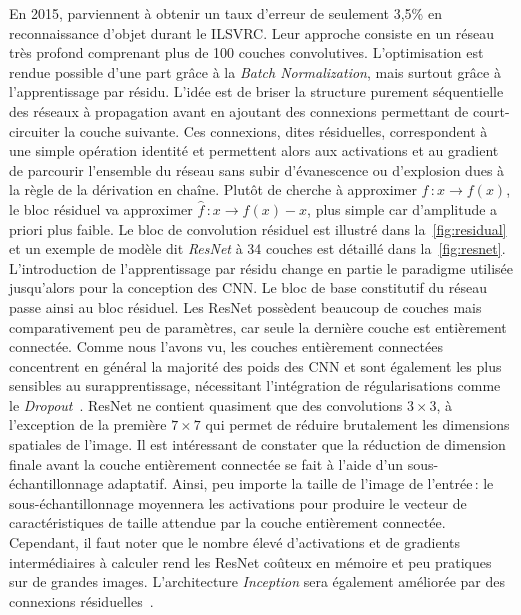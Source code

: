En 2015, \citet{he_deep_2016} parviennent à obtenir un taux d'erreur de seulement 3,5\% en reconnaissance d'objet durant le \gls{ILSVRC}. Leur approche consiste en un réseau très profond comprenant plus de 100 couches convolutives. L'optimisation est rendue possible d'une part grâce à la \emph{Batch Normalization}, mais surtout grâce à l'apprentissage par résidu. L'idée est de briser la structure purement séquentielle des réseaux à propagation avant en ajoutant des connexions permettant de court-circuiter la couche suivante. Ces connexions, dites résiduelles, correspondent à une simple opération identité et permettent alors aux activations et au gradient de parcourir l'ensemble du réseau sans subir d’évanescence ou d'explosion dues à la règle de la dérivation en chaîne. Plutôt de cherche à approximer $f\,: x \rightarrow f(x)$, le bloc résiduel va approximer $\hat{f}\,: x \rightarrow f(x) - x$, plus simple car d'amplitude a priori plus faible. Le bloc de convolution résiduel est illustré dans la~\cref{fig:residual} et un exemple de modèle dit \emph{ResNet} à 34 couches est détaillé dans la~\cref{fig:resnet}. L'introduction de l'apprentissage par résidu change en partie le paradigme utilisée jusqu'alors pour la conception des \gls{CNN}. Le bloc de base constitutif du réseau passe ainsi au bloc résiduel.
Les ResNet possèdent beaucoup de couches mais comparativement peu de paramètres, car seule la dernière couche est entièrement connectée. Comme nous l'avons vu, les couches entièrement connectées concentrent en général la majorité des poids des \gls{CNN} et sont également les plus sensibles au surapprentissage, nécessitant l'intégration de régularisations comme le \emph{Dropout}~\cite{srivastava_dropout_2014}. ResNet ne contient quasiment que des convolutions $3\times3$, à l'exception de la première $7\times7$ qui permet de réduire brutalement les dimensions spatiales de l'image. Il est intéressant de constater que la réduction de dimension finale avant la couche entièrement connectée se fait à l'aide d'un sous-échantillonnage adaptatif. Ainsi, peu importe la taille de l'image de l'entrée\,: le sous-échantillonnage moyennera les activations pour produire le vecteur de caractéristiques de taille attendue par la couche entièrement connectée. Cependant, il faut noter que le nombre élevé d'activations et de gradients intermédiaires à calculer rend les ResNet coûteux en mémoire et peu pratiques sur de grandes images. L'architecture \emph{Inception} sera également améliorée par des connexions résiduelles~\cite{szegedy_inception-v4_2017}.


